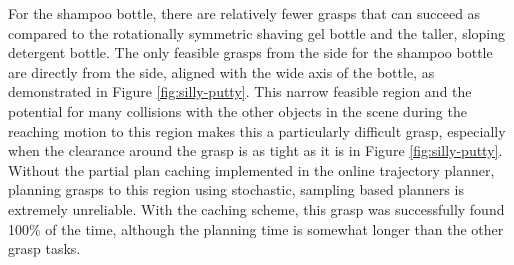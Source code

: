 For the shampoo bottle, there are relatively fewer grasps that can succeed as compared to the rotationally symmetric shaving gel bottle and the taller, sloping detergent bottle. The only feasible grasps from the side for the shampoo bottle are directly from the side, aligned with the wide axis of the bottle, as demonstrated in Figure \ref{fig:silly-putty}. This narrow feasible region and the potential for many collisions with the other objects in the scene during the reaching motion to this region makes this a particularly difficult grasp, especially when the clearance around the grasp is as tight as it is in Figure \ref{fig:silly-putty}. Without the partial plan caching implemented in the online trajectory planner, planning grasps to this region using stochastic, sampling based planners is extremely unreliable. With the caching scheme, this grasp was successfully found 100\% of the time, although the planning time is somewhat longer than the other grasp tasks.  


